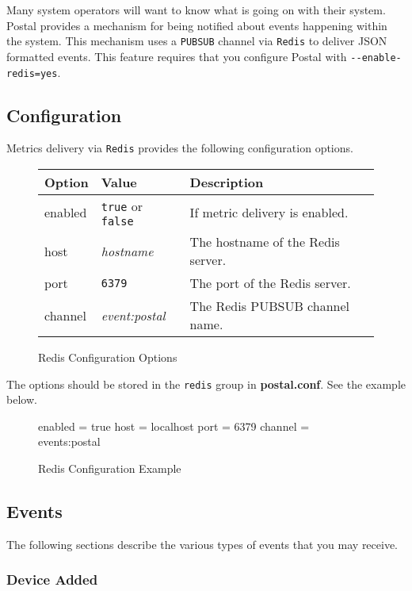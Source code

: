 \documentclass[12pt]{article}
\newcommand{\file}[1]{{\bf\ttfamily #1}}
\begin{document}
Many system operators will want to know what is going on with their system.
Postal provides a mechanism for being notified about events happening within the system.
This mechanism uses a \verb|PUBSUB| channel via \verb|Redis| to deliver JSON formatted events.
This feature requires that you configure Postal with \verb|--enable-redis=yes|.

\subsection{Configuration}

Metrics delivery via \verb|Redis| provides the following configuration options.

\begin{figure}[h!]
\centering
\begin{tabular}{l l l}
\hline
Option & Value & Description \\
\hline
enabled & \verb|true| or \verb|false| & If metric delivery is enabled. \\
host & \emph{hostname} & The hostname of the Redis server. \\
port & \verb|6379| & The port of the Redis server. \\
channel & \emph{event:postal} & The Redis PUBSUB channel name. \\
\hline
\end{tabular}
\caption{Redis Configuration Options}
\end{figure}

The options should be stored in the \verb|redis| group in \file{postal.conf}.
See the example below.

\begin{figure}[h!]
\begin{Terminal}
[redis]
enabled = true
host = localhost
port = 6379
channel = events:postal
\end{Terminal}
\caption{Redis Configuration Example}
\end{figure}

\subsection{Events}

The following sections describe the various types of events that you may receive.

\subsubsection{Device Added}
\end{document}
